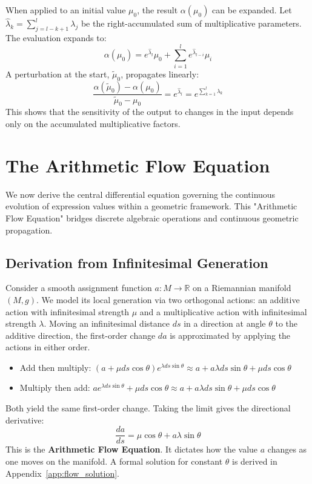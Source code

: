 \documentclass[12pt]{article}
\begin{document}
When applied to an initial value \( \mu_0 \), the result \( \alpha(\mu_0) \) can be expanded. Let \( \hat{\lambda}_k = \sum_{j=l-k+1}^{l} \lambda_j \) be the right-accumulated sum of multiplicative parameters. The evaluation expands to:
\begin{equation}
\alpha(\mu_0) = e^{\hat{\lambda}_l} \mu_0 + \sum_{i=1}^l e^{\hat{\lambda}_{l-i}} \mu_i \label{eq:alternating_expansion_cs}
\end{equation}
A perturbation at the start, \( \tilde{\mu}_0 \), propagates linearly:
\begin{equation}
\frac{\alpha(\tilde{\mu}_0) - \alpha(\mu_0)}{\tilde{\mu}_0 - \mu_0} = e^{\hat{\lambda}_l} = e^{\sum_{k=1}^l \lambda_k} \label{eq:ratio_cs}
\end{equation}
This shows that the sensitivity of the output to changes in the input depends only on the accumulated multiplicative factors.

\section{The Arithmetic Flow Equation}\label{sec:flow_equation_cs}

We now derive the central differential equation governing the continuous evolution of expression values within a geometric framework. This "Arithmetic Flow Equation" bridges discrete algebraic operations and continuous geometric propagation.

\subsection{Derivation from Infinitesimal Generation}

Consider a smooth assignment function \( a: M \to \mathbb{R} \) on a Riemannian manifold \( (M, g) \). We model its local generation via two orthogonal actions: an additive action with infinitesimal strength \( \mu \) and a multiplicative action with infinitesimal strength \( \lambda \). Moving an infinitesimal distance \( ds \) in a direction at angle \( \theta \) to the additive direction, the first-order change \( da \) is approximated by applying the actions in either order.
\begin{itemize}
    \item Add then multiply: \( (a + \mu ds \cos \theta) e^{\lambda ds \sin \theta} \approx a + a \lambda ds \sin \theta + \mu ds \cos \theta \)
    \item Multiply then add: \( a e^{\lambda ds \sin \theta} + \mu ds \cos \theta \approx a + a \lambda ds \sin \theta + \mu ds \cos \theta \)
\end{itemize}
Both yield the same first-order change. Taking the limit gives the directional derivative:
\begin{equation}
    \frac{da}{ds} = \mu \cos \theta + a \lambda \sin \theta \label{eq:flow_cs}
\end{equation}
This is the \textbf{Arithmetic Flow Equation}. It dictates how the value \( a \) changes as one moves on the manifold. A formal solution for constant \( \theta \) is derived in Appendix~\ref{app:flow_solution}.
\end{document}
